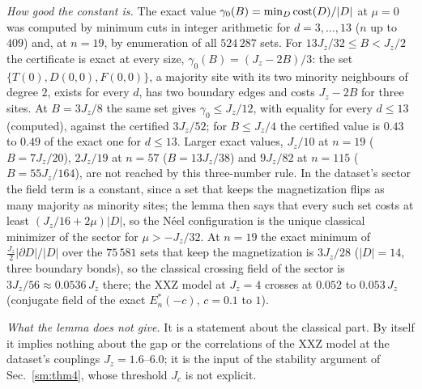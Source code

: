 \documentclass[aps,prx,onecolumn,10pt,nofootinbib,longbibliography,floatfix]{revtex4-2}
\theoremstyle{remark}
\newcommand{\Jz}{J_z}
\begin{document}
\emph{How good the constant is.} The exact value $\gamma_0(B)=\min_D{\rm cost}(D)/|D|$ at $\mu=0$ was computed by
minimum cuts in integer arithmetic for $d=3,\dots,13$ ($n$ up to $409$) and, at $n=19$, by enumeration of all %
$524\,287$ sets. For $13\Jz/32\le B<\Jz/2$ the certificate is exact at every size, $\gamma_0(B)=(\Jz-2B)/3$: the %
set $\{T(0),D(0,0),F(0,0)\}$, a majority site with its two minority neighbours of degree $2$, exists for every $d$, %
has two boundary edges and costs $\Jz-2B$ for three sites. At $B=3\Jz/8$ the same set gives
$\gamma_0\le\Jz/12$, with equality for every $d\le13$ (computed), against the certified $3\Jz/52$; for %
$B\le\Jz/4$ the certified value is $0.43$ to $0.49$ of the exact one for $d\le13$. Larger exact values, %
$\Jz/10$ at $n=19$ ($B=7\Jz/20$), $2\Jz/19$ at $n=57$ ($B=13\Jz/38$) and $9\Jz/82$ at $n=115$ ($B=55\Jz/164$), are %
not reached by this three-number rule.
In the dataset's sector the field term is a constant, since a set that keeps the magnetization flips as many
majority as minority sites; the lemma then says that every such set costs at least $(\Jz/16+2\mu)|D|$, so the %
N\'eel configuration is the unique classical minimizer of the sector for $\mu>-\Jz/32$. At $n=19$ the exact %
minimum of $\frac{\Jz}{2}|\partial D|/|D|$ over the $75\,581$ sets that keep the magnetization is $3\Jz/28$ %
($|D|=14$, three boundary bonds), so the classical crossing field of the sector is $3\Jz/56\approx0.0536\,\Jz$ %
there; the XXZ model at $\Jz=4$ crosses at $0.052$ to $0.053\,\Jz$ (conjugate field of the exact %
$E^*_n(-c)$, $c=0.1$ to $1$). %

\emph{What the lemma does not give.} It is a statement about the classical part. By itself it implies nothing about
the gap or the correlations of the XXZ model at the dataset's couplings $\Jz=1.6$--$6.0$; it is the input of the %
stability argument of Sec.~\ref{sm:thm4}, whose threshold $J_c$ is not explicit.
\end{document}
